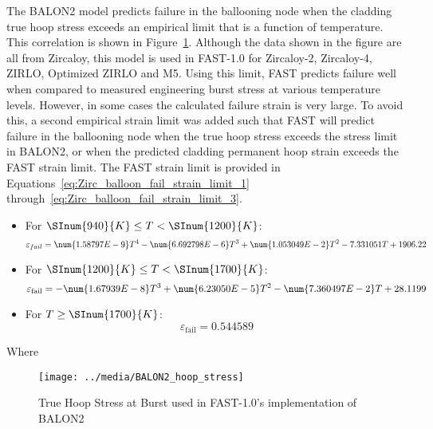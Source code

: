 The BALON2 model predicts failure in the ballooning node when the cladding true hoop stress exceeds
an empirical limit that is a function of temperature. This correlation is shown in
Figure~\ref{fig:BALON2_hoop_stress_at_burst}. Although the data shown in the figure are all from
Zircaloy, this model is used in FAST-1.0 for Zircaloy-2, Zircaloy-4, ZIRLO\TM, Optimized ZIRLO\TM
and M5\TM.  Using this limit, FAST predicts failure well when compared to measured engineering burst
stress at various temperature levels. However, in some cases the calculated failure strain is very
large. To avoid this, a second empirical strain limit was added such that FAST will predict failure
in the ballooning node when the true hoop stress exceeds the stress limit in BALON2, or when the
predicted cladding permanent hoop strain exceeds the FAST strain limit. The FAST strain limit is
provided in Equations~\ref{eq:Zirc_balloon_fail_strain_limit_1}
through~\ref{eq:Zirc_balloon_fail_strain_limit_3}.

\begin{itemize}
    \item
        For \(\SInum{940}{K} \leq T < \SInum{1200}{K}\):
        \begin{equation}
            \label{eq:Zirc_balloon_fail_strain_limit_1}
            \varepsilon_{fail} = \num{1.58797E- 9}T^{4} - \num{6.692798E- 6}T^{3} + \num{1.053049E- 2}T^{2} - 7.331051T + 1906.22
        \end{equation}
    \item
        For \(\SInum{1200}{K} \leq T < \SInum{1700}{K}\):
        \begin{equation}
            \label{eq:Zirc_balloon_fail_strain_limit_2}
            \varepsilon_{\text{fail}} = - \num{1.67939E- 8}T^{3} + \num{6.23050E- 5}T^{2} - \num{7.360497E- 2}T + 28.1199
        \end{equation}
    \item
        For \(T \geq \SInum{1700}{K}\):
        \begin{equation}
            \label{eq:Zirc_balloon_fail_strain_limit_3}
            \varepsilon_{\text{fail}} = 0.544589
        \end{equation}
\end{itemize}

Where

\begin{figure}
    \texttt{[image: ../media/BALON2\_hoop\_stress]}
    \caption{True Hoop Stress at Burst used in FAST-1.0's implementation of BALON2}
    \label{fig:BALON2_hoop_stress_at_burst}
\end{figure}

